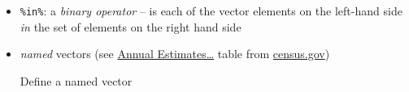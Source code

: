 \documentclass[]{book}
\newenvironment{Shaded}{\begin{snugshade}}{\end{snugshade}}
\newcommand{\CommentTok}[1]{\textcolor[rgb]{0.56,0.35,0.01}{\textit{#1}}}
\newcommand{\KeywordTok}[1]{\textcolor[rgb]{0.13,0.29,0.53}{\textbf{#1}}}
\newcommand{\NormalTok}[1]{#1}
\newcommand{\OperatorTok}[1]{\textcolor[rgb]{0.81,0.36,0.00}{\textbf{#1}}}
\newcommand{\StringTok}[1]{\textcolor[rgb]{0.31,0.60,0.02}{#1}}
\begin{document}
\begin{itemize}
\item
  \texttt{\%in\%}: a \emph{binary operator} -- is each of the vector elements on the left-hand side \emph{in} the set of elements on the right hand side

\begin{Shaded}
\end{Shaded}
\item
  \emph{named} vectors (see \href{https://www2.census.gov/programs-surveys/popest/tables/2010-2019/state/totals/nst-est2019-01.xlsx}{Annual Estimates\ldots{}} table from \href{https://www.census.gov/data/datasets/time-series/demo/popest/2010s-state-total.html}{census.gov})

  Define a named vector


\end{itemize}
\end{document}
